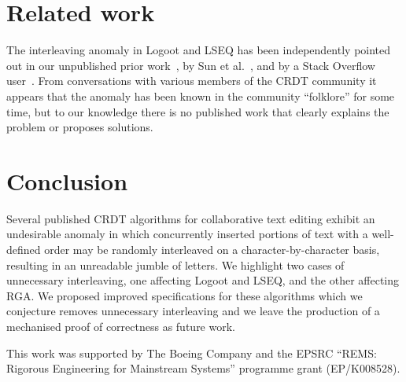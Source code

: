 \documentclass[sigconf]{acmart}
\begin{document}
\section{Related work}\label{sec:relwork}

The interleaving anomaly in Logoot and LSEQ has been independently pointed out in our unpublished prior work~\cite{ExtendedVersion}, by Sun et al.~\cite{Sun:2018wb}, and by a Stack Overflow user~\cite{StackOverflowInterleaving}.
From conversations with various members of the CRDT community it appears that the anomaly has been known in the community ``folklore'' for some time, but to our knowledge there is no published work that clearly explains the problem or proposes solutions.

\section{Conclusion}

Several published CRDT algorithms for collaborative text editing exhibit an undesirable anomaly in which concurrently inserted portions of text with a well-defined order may be randomly interleaved on a character-by-character basis, resulting in an unreadable jumble of letters.
We highlight two cases of unnecessary interleaving, one affecting Logoot and LSEQ, and the other affecting RGA.
We proposed improved specifications for these algorithms which we conjecture removes unnecessary interleaving and we leave the production of a mechanised proof of correctness as future work.

\begin{acks}
This work was supported by The Boeing Company and the EPSRC ``REMS: Rigorous Engineering for Mainstream Systems'' programme grant (EP/K008528).
\end{acks}



\end{document}
